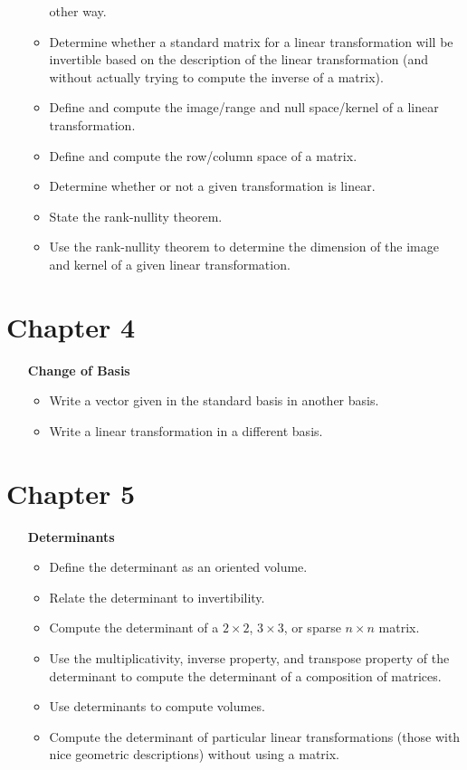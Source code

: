 \documentclass[letter]{article}
\begin{document}
\begin{enumerate}
\begin{itemize}
					other way.
				\item Determine whether a standard matrix for a linear transformation will be 
					invertible based on the description of the linear transformation
					(and without actually trying to compute the inverse of a matrix).
				\item Define and compute the image/range and null space/kernel of a linear transformation.
				\item Define and compute the row/column space of a matrix.
				\item Determine whether or not a given transformation is linear.
				\item State the rank-nullity theorem.
				\item Use the rank-nullity theorem to determine the dimension of the image and
					kernel of a given linear transformation.
			\end{itemize}
	\end{enumerate}
	
	\section*{Chapter 4}
	\begin{enumerate}
		\item[\bf Change of Basis] 
			\begin{itemize}
				\item Write a vector given in the standard basis in another basis.
				\item Write a linear transformation in a different basis.
			\end{itemize}
	\end{enumerate}
	\section*{Chapter 5}
	\begin{enumerate}
		\item[\bf Determinants] 
			\begin{itemize}
				\item Define the determinant as an oriented volume.
				\item Relate the determinant to invertibility.
				\item Compute the determinant of a $2\times 2$, $3\times 3$, or 
					sparse $n\times n$ matrix.
				\item Use the multiplicativity, inverse property, and transpose property
					of the determinant to compute the determinant of a composition of
					matrices.
				\item Use determinants to compute volumes.
				\item Compute the determinant of particular linear transformations (those with
					nice geometric descriptions) without using a matrix.
			\end{itemize}
	\end{enumerate}
\end{document}
